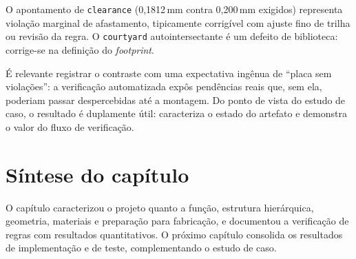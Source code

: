 O apontamento de \texttt{clearance} (0,1812\,mm contra 0,200\,mm exigidos)
representa violação marginal de afastamento, tipicamente corrigível com ajuste
fino de trilha ou revisão da regra. O \texttt{courtyard} autointersectante é
um defeito de biblioteca: corrige-se na definição do \emph{footprint}.

É relevante registrar o contraste com uma expectativa ingênua de ``placa sem
violações'': a verificação automatizada expôs pendências reais que, sem ela,
poderiam passar despercebidas até a montagem. Do ponto de vista do estudo de
caso, o resultado é duplamente útil: caracteriza o estado do artefato e
demonstra o valor do fluxo de verificação.

\section{Síntese do capítulo}

O capítulo caracterizou o projeto quanto a função, estrutura hierárquica,
geometria, materiais e preparação para fabricação, e documentou a verificação
de regras com resultados quantitativos. O próximo capítulo consolida os
resultados de implementação e de teste, complementando o estudo de caso.
